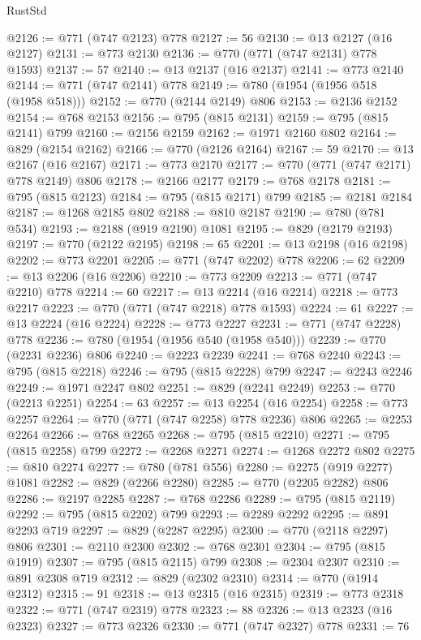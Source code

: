 \begin{lexlean}{RustStd}
\begin{coremodule}
{\begin{coremodule}
{{{{{{{{{{{{{{{@2126 := @771 (@747 @2123) @778
@2127 := 56
@2130 := @13 @2127 (@16 @2127)
@2131 := @773 @2130
@2136 := @770 (@771 (@747 @2131) @778 @1593)
@2137 := 57
@2140 := @13 @2137 (@16 @2137)
@2141 := @773 @2140
@2144 := @771 (@747 @2141) @778
@2149 := @780 (@1954 (@1956 @518 (@1958 @518)))
@2152 := @770 (@2144 @2149) @806
@2153 := @2136 @2152
@2154 := @768 @2153
@2156 := @795 (@815 @2131)
@2159 := @795 (@815 @2141) @799
@2160 := @2156 @2159
@2162 := @1971 @2160 @802
@2164 := @829 (@2154 @2162)
@2166 := @770 (@2126 @2164)
@2167 := 59
@2170 := @13 @2167 (@16 @2167)
@2171 := @773 @2170
@2177 := @770 (@771 (@747 @2171) @778 @2149) @806
@2178 := @2166 @2177
@2179 := @768 @2178
@2181 := @795 (@815 @2123)
@2184 := @795 (@815 @2171) @799
@2185 := @2181 @2184
@2187 := @1268 @2185 @802
@2188 := @810 @2187
@2190 := @780 (@781 @534)
@2193 := @2188 (@919 @2190) @1081
@2195 := @829 (@2179 @2193)
@2197 := @770 (@2122 @2195)
@2198 := 65
@2201 := @13 @2198 (@16 @2198)
@2202 := @773 @2201
@2205 := @771 (@747 @2202) @778
@2206 := 62
@2209 := @13 @2206 (@16 @2206)
@2210 := @773 @2209
@2213 := @771 (@747 @2210) @778
@2214 := 60
@2217 := @13 @2214 (@16 @2214)
@2218 := @773 @2217
@2223 := @770 (@771 (@747 @2218) @778 @1593)
@2224 := 61
@2227 := @13 @2224 (@16 @2224)
@2228 := @773 @2227
@2231 := @771 (@747 @2228) @778
@2236 := @780 (@1954 (@1956 @540 (@1958 @540)))
@2239 := @770 (@2231 @2236) @806
@2240 := @2223 @2239
@2241 := @768 @2240
@2243 := @795 (@815 @2218)
@2246 := @795 (@815 @2228) @799
@2247 := @2243 @2246
@2249 := @1971 @2247 @802
@2251 := @829 (@2241 @2249)
@2253 := @770 (@2213 @2251)
@2254 := 63
@2257 := @13 @2254 (@16 @2254)
@2258 := @773 @2257
@2264 := @770 (@771 (@747 @2258) @778 @2236) @806
@2265 := @2253 @2264
@2266 := @768 @2265
@2268 := @795 (@815 @2210)
@2271 := @795 (@815 @2258) @799
@2272 := @2268 @2271
@2274 := @1268 @2272 @802
@2275 := @810 @2274
@2277 := @780 (@781 @556)
@2280 := @2275 (@919 @2277) @1081
@2282 := @829 (@2266 @2280)
@2285 := @770 (@2205 @2282) @806
@2286 := @2197 @2285
@2287 := @768 @2286
@2289 := @795 (@815 @2119)
@2292 := @795 (@815 @2202) @799
@2293 := @2289 @2292
@2295 := @891 @2293 @719
@2297 := @829 (@2287 @2295)
@2300 := @770 (@2118 @2297) @806
@2301 := @2110 @2300
@2302 := @768 @2301
@2304 := @795 (@815 @1919)
@2307 := @795 (@815 @2115) @799
@2308 := @2304 @2307
@2310 := @891 @2308 @719
@2312 := @829 (@2302 @2310)
@2314 := @770 (@1914 @2312)
@2315 := 91
@2318 := @13 @2315 (@16 @2315)
@2319 := @773 @2318
@2322 := @771 (@747 @2319) @778
@2323 := 88
@2326 := @13 @2323 (@16 @2323)
@2327 := @773 @2326
@2330 := @771 (@747 @2327) @778
@2331 := 76
}}}}}}}}}}}}}}}
\end{coremodule}}
\end{coremodule}
\end{lexlean}
